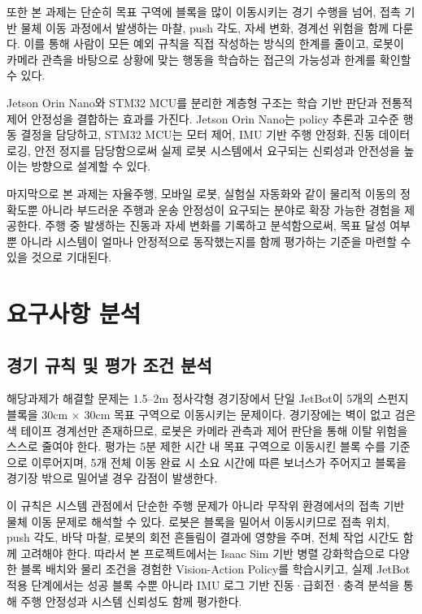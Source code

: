 \documentclass[titlepage]{pnureport}
\begin{document}
또한 본 과제는 단순히 목표 구역에 블록을 많이 이동시키는 경기 수행을 넘어, 접촉 기반 물체 이동 과정에서 발생하는 마찰, push 각도, 자세 변화, 경계선 위험을 함께 다룬다. 이를 통해 사람이 모든 예외 규칙을 직접 작성하는 방식의 한계를 줄이고, 로봇이 카메라 관측을 바탕으로 상황에 맞는 행동을 학습하는 접근의 가능성과 한계를 확인할 수 있다.

Jetson Orin Nano와 STM32 MCU를 분리한 계층형 구조는 학습 기반 판단과 전통적 제어 안정성을 결합하는 효과를 가진다. Jetson Orin Nano는 policy 추론과 고수준 행동 결정을 담당하고, STM32 MCU는 모터 제어, IMU 기반 주행 안정화, 진동 데이터 로깅, 안전 정지를 담당함으로써 실제 로봇 시스템에서 요구되는 신뢰성과 안전성을 높이는 방향으로 설계할 수 있다.

마지막으로 본 과제는 자율주행, 모바일 로봇, 실험실 자동화와 같이 물리적 이동의 정확도뿐 아니라 부드러운 주행과 운송 안정성이 요구되는 분야로 확장 가능한 경험을 제공한다. 주행 중 발생하는 진동과 자세 변화를 기록하고 분석함으로써, 목표 달성 여부뿐 아니라 시스템이 얼마나 안정적으로 동작했는지를 함께 평가하는 기준을 마련할 수 있을 것으로 기대된다.

\chapter{요구사항 분석}

\section{경기 규칙 및 평가 조건 분석}

해당과제가 해결할 문제는 1.5--2m 정사각형 경기장에서 단일 JetBot이 5개의 스펀지 블록을 30cm $\times$ 30cm 목표 구역으로 이동시키는 문제이다. 경기장에는 벽이 없고 검은색 테이프 경계선만 존재하므로, 로봇은 카메라 관측과 제어 판단을 통해 이탈 위험을 스스로 줄여야 한다. 평가는 5분 제한 시간 내 목표 구역으로 이동시킨 블록 수를 기준으로 이루어지며, 5개 전체 이동 완료 시 소요 시간에 따른 보너스가 주어지고 블록을 경기장 밖으로 밀어낼 경우 감점이 발생한다.

이 규칙은 시스템 관점에서 단순한 주행 문제가 아니라 무작위 환경에서의 접촉 기반 물체 이동 문제로 해석할 수 있다. 로봇은 블록을 밀어서 이동시키므로 접촉 위치, push 각도, 바닥 마찰, 로봇의 회전 흔들림이 결과에 영향을 주며, 전체 작업 시간도 함께 고려해야 한다. 따라서 본 프로젝트에서는 Isaac Sim 기반 병렬 강화학습으로 다양한 블록 배치와 물리 조건을 경험한 Vision-Action Policy를 학습시키고, 실제 JetBot 적용 단계에서는 성공 블록 수뿐 아니라 IMU 로그 기반 진동·급회전·충격 분석을 통해 주행 안정성과 시스템 신뢰성도 함께 평가한다.
\end{document}
